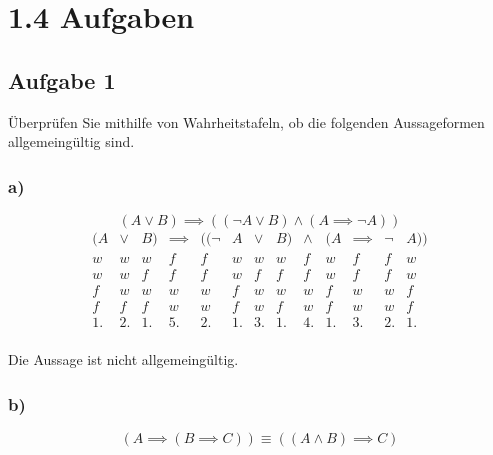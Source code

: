 \documentclass[main.tex]{subfiles}
\begin{document}
\section{1.4 Aufgaben}

\subsection{Aufgabe 1}
Überprüfen Sie mithilfe von Wahrheitstafeln, ob die folgenden Aussageformen allgemeingültig sind.

\subsubsection{a)}
$$
    (A \lor B) \implies (( \lnot A \lor B) \land (A \implies \lnot A))
$$
\begin{equation*}
\begin{array}{d|e|d|h|e|d|f|e|g|d|f|e|d}
    (A  & \lor &  B) & \implies & (( \lnot &  A & \lor & B) & \land & (A & \implies & \lnot & A))\\
    \hline
     w  & w  & w  & f  & f  & w  & w  & w  & f  & w  & f  & f  & w\\
     w  & w  & f  & f  & f  & w  & f  & f  & f  & w  & f  & f  & w\\
     f  & w  & w  & w  & w  & f  & w  & w  & w  & f  & w  & w  & f\\
     f  & f  & f  & w  & w  & f  & w  & f  & w  & f  & w  & w  & f\\
    \hline
     1. & 2. & 1. & 5. & 2. & 1. & 3. & 1. & 4. & 1. & 3. & 2. & 1.\\
\end{array}
\end{equation*}

Die Aussage ist nicht allgemeingültig.

\subsubsection{b)}
$$
    (A \implies (B \implies C)) \equiv ((A \land B) \implies C)
$$
\end{document}
